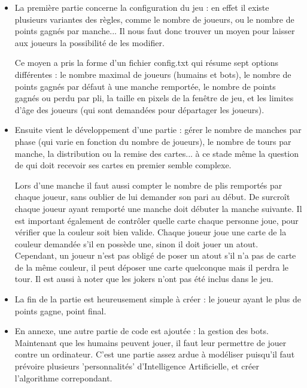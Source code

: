 \documentclass[12pt]{report}
\begin{document}
	\begin{itemize}[label=\textbullet, font=\LARGE]
		\item La première partie concerne la configuration du jeu : en effet il existe plusieurs variantes des règles, comme le nombre de joueurs, ou le nombre de points gagnés par manche... Il nous faut donc trouver un moyen pour laisser aux joueurs la possibilité de les modifier.
		
		Ce moyen a pris la forme d'un fichier config.txt qui résume sept options différentes : le nombre maximal de joueurs (humains et bots), le nombre de points gagnés par défaut à une manche remportée, le nombre de points gagnés ou perdu par pli, la taille en pixels de la fenêtre de jeu, et les limites d'âge des joueurs (qui sont demandées pour départager les joueurs).\\
		
		\item Ensuite vient le développement d'une partie : gérer le nombre de manches par phase (qui varie en fonction du nombre de joueurs), le nombre de tours par manche, la distribution ou la remise des cartes... à ce stade même la question de qui doit recevoir ses cartes en premier semble complexe.
		
		Lors d'une manche il faut aussi compter le nombre de plis remportés par chaque joueur, sans oublier de lui demander son pari au début. De surcroît chaque joueur ayant remporté une manche doit débuter la manche suivante. Il est important également de contrôler quelle carte chaque personne joue, pour vérifier que la couleur soit bien valide. Chaque joueur joue une carte de la couleur demandée s'il en possède une, sinon il doit jouer un atout. Cependant, un joueur n'est pas obligé de poser un atout s'il n'a pas de carte de la même couleur, il peut déposer une carte quelconque mais il perdra le tour. Il est aussi à noter que les jokers n'ont pas été inclus dans le jeu.\\
		
		\item La fin de la partie est heureusement simple à créer : le joueur ayant le plus de points gagne, point final.\\

		\item En annexe, une autre partie de code est ajoutée : la gestion des bots. Maintenant que les humains peuvent jouer, il faut leur permettre de jouer contre un ordinateur. C'est une partie assez ardue à modéliser puisqu'il faut prévoire plusieurs 'personnalités' d'Intelligence Artificielle, et créer l'algorithme correpondant.
	\end{itemize}
	
\end{document}
